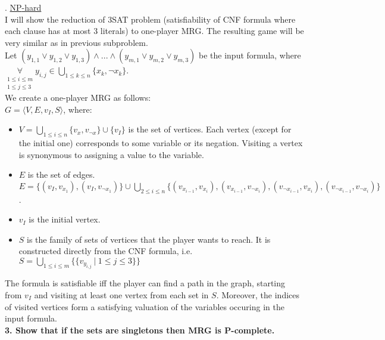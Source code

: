 . \underline{\textsc{NP}-hard}\\
I will show the reduction of 3SAT problem (satisfiability of CNF formula where each clause has at most 3 literals) to
one-player MRG. The resulting game will be very similar as in previous subproblem.\\
Let $(y_{1,1} \lor y_{1,2} \lor y_{1,3}) \land ... \land (y_{m,1} \lor y_{m,2} \lor y_{m,3})$ be the input formula,
where $\underset{\substack{1 \leq i \leq m\\1 \leq j \leq 3}}{\forall} y_{i,j} \in \underset{1 \leq k \leq n}{\bigcup} \{ x_k, \lnot x_k \}$.\\
We create a one-player MRG as follows:\\
$G = \langle V, E, v_I, S \rangle$, where:
\begin{itemize}
      \item $V = \underset{1 \leq i \leq n}{\bigcup} \{v_x, v_{\lnot x}\} \cup \{v_I\}$ is the set of vertices.
            Each vertex (except for the initial one) corresponds to some variable or its negation. Visiting a
            vertex is synonymous to assigning a value to the variable.
      \item $E$ is the set of edges.
            $E = \{(v_I, v_{x_1}), (v_I, v_{\lnot x_1})\} \cup
            \underset{2 \leq i \leq n}{\bigcup} \{ (v_{x_{i-1}}, v_{x_i}), (v_{x_{i-1}}, v_{\lnot x_i}),
            (v_{\lnot x_{i-1}}, v_{x_i}), (v_{\lnot x_{i-1}}, v_{\lnot x_i}) \}$.
      \item $v_I$ is the initial vertex.
      \item $S$ is the family of sets of vertices that the player wants to reach.
            It is constructed directly from the CNF formula, i.e.
            $S = \underset{1 \leq i \leq m}{\bigcup} \{ \{ v_{y_{i,j}}\ |\ 1 \leq j \leq 3 \} \}$
\end{itemize}
The formula is satisfiable iff the player can find a path in the graph, starting from $v_I$ and visiting
at least one vertex from each set in $S$. Moreover, the indices of visited vertices form a satisfying valuation
of the variables occuring in the input formula.\\

\noindent
\textbf{3. Show that if the sets are singletons then MRG is P-complete.}\\

